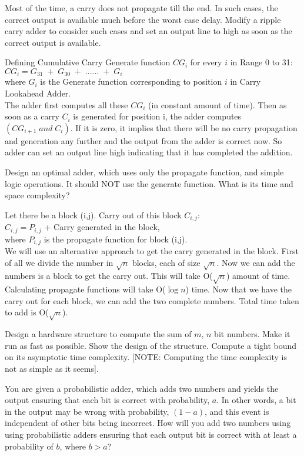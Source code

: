 \begin{ExerciseList}
\Exercise[difficulty=1]
Most of the time, a carry does not propagate till the end.
In such cases, the correct output is available much before the worst case delay.
Modify a ripple carry adder to consider such cases and set an output line to high as soon as
the correct output is available.

\Answer
Defining Cumulative Carry Generate function $CG_i$ for every $i$ in Range 0 to 31:\\
$CG_i=G_{31}\;+\;G_{30}\;+\;......\;+\;G_i$\\
where $G_i$ is the Generate function corresponding to position $i$ in Carry Lookahead Adder.\\ The adder first computes
all these $CG_i$ (in constant amount of time). Then as soon as a carry $C_i$ is generated for position i, the adder
computes $(CG_{i+1}\; and \;C_i)$. If it is zero, it implies that there will be no carry propagation and generation any
further and the output from the adder is correct now. So adder can set an output line high indicating that it has
completed the addition.


\Exercise[difficulty=1]
Design an optimal adder, which uses only the propagate function, and simple
logic operations. It should NOT use the generate function. What is its time and space complexity?

\Answer
Let there be a block (i,j). Carry out of this block $C_{i,j}$:\\
$C_{i,j} = P_{i,j}$ + Carry generated in the block,\\
where $P_{i,j}$ is the propagate function for block (i,j).\\
We will use an alternative approach to get the carry generated in the block. First of all we divide the number in
$\sqrt{n}$ blocks, each of size $\sqrt{n}$. Now we can add the numbers is a block to get the carry out. This will take
O($\sqrt{n}$) amount of time. Calculating propagate functions will take O($\log n$) time. Now that we have the carry out
for each block, we can add the two complete numbers. Total time taken to add is O($\sqrt{n}$).

\Exercise
Design a hardware structure to compute the sum of $m$, $n$ bit numbers. Make it run as fast as possible. Show the design
of the structure. Compute a tight bound on its asymptotic time complexity. [NOTE: Computing the time
complexity is not as simple as it seems].


\Exercise[difficulty=2]
You are given a probabilistic adder, which adds two numbers and yields the output
ensuring that each bit is correct with probability, $a$.
In other words, a bit in the output may be wrong with probability, $(1-a)$, and this event is independent
of other bits being incorrect.
How will you add two numbers using using probabilistic adders 
ensuring that each output bit is correct with at least a probability of $b$, where $b>a$?



\end{ExerciseList}
